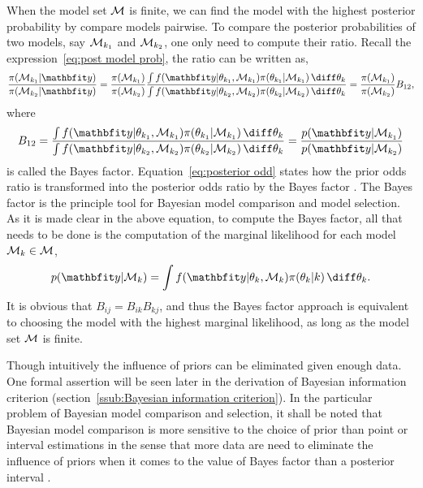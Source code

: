 When the model set $\mathcal{M}$ is finite, we can find the model with the highest
posterior probability by compare models pairwise. To compare the posterior
probabilities of two models, say $\mathcal{M}_{k_1}$ and $\mathcal{M}_{k_2}$, one only
need to compute their ratio. Recall the expression~\eqref{eq:post model prob},
the ratio can be written as,
\begin{equation}
  \frac{\pi(\calM_{k_1}|\data)}{\pi(\calM_{k_2}|\data)}
  = \frac{\pi(\calM_{k_1})}{\pi(\calM_{k_2})} \frac
  {\int f(\data|\theta_{k_1},\calM_{k_1})\pi(\theta_{k_1}|\calM_{k_1})
      \intd\theta_k}
  {\int f(\data|\theta_{k_2},\calM_{k_2})\pi(\theta_{k_2}|\calM_{k_2})
      \intd\theta_k}
  = \frac{\pi(\calM_{k_1})}{\pi(\calM_{k_2})}B_{12},
  \label{eq:posterior odd}
\end{equation}
where
\begin{equation}
  B_{12} = \frac
  {\int f(\data|\theta_{k_1},\calM_{k_1})\pi(\theta_{k_1}|\calM_{k_1})
      \intd\theta_k}
  {\int f(\data|\theta_{k_2},\calM_{k_2})\pi(\theta_{k_2}|\calM_{k_2})
      \intd\theta_k}
    = \frac{p(\data|\calM_{k_1})}{p(\data|\calM_{k_2})}
  \label{eq:bayes factor}
\end{equation}
is called the Bayes factor. Equation~\eqref{eq:posterior odd} states how the
prior odds ratio is transformed into the posterior odds ratio by the Bayes
factor \cite{Kass:1995vb}. The Bayes factor is the principle tool for
Bayesian model comparison and model selection. As it is made clear in the
above equation, to compute the Bayes factor, all that needs to be done is the
computation of the marginal likelihood for each model $\mathcal{M}_k\in\mathcal{M}$,
\begin{equation}
  p(\data|\calM_k) =
  \int f(\data|\theta_k,\calM_k)\pi(\theta_k|k)\intd\theta_k.
\end{equation}
It is obvious that $B_{ij} = B_{ik} B_{kj}$, and thus the Bayes
factor approach is equivalent to choosing the model with the highest marginal
likelihood, as long as the model set $\mathcal{M}$ is finite.

Though intuitively the influence of priors can be eliminated given enough
data. One formal assertion will be seen later in the derivation of Bayesian
information criterion (section~\ref{ssub:Bayesian information criterion}). In
the particular problem of Bayesian model comparison and selection, it shall be
noted that Bayesian model comparison is more sensitive to the choice of prior
than point or interval estimations in the sense that more data are need to
eliminate the influence of priors when it comes to the value of Bayes factor
than a posterior interval \cite{Kass:1993vy, Kass:1995vb}. 

